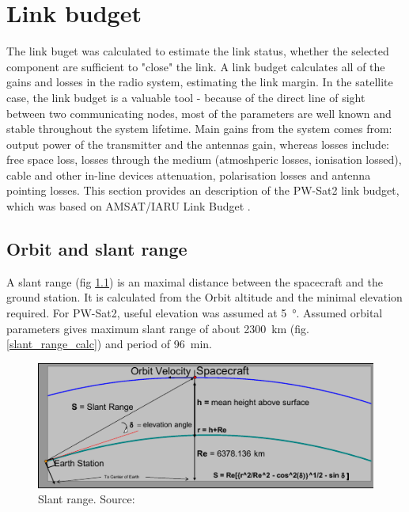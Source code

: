 \chapter{Link budget}
The link buget was calculated to estimate the link status, whether the selected component are sufficient to "close" the link. A link budget calculates all of the gains and losses in the radio system, estimating the link margin. In the satellite case, the link budget is a valuable tool - because of the direct line of sight between two communicating nodes, most of the parameters are well known and stable throughout the system lifetime. Main gains from the system comes from: output power of the transmitter and the antennas gain, whereas losses include: free space loss, losses through the medium (atmoshperic losses, ionisation lossed), cable and other in-line devices attenuation, polarisation losses and antenna pointing losses. This section provides an description of the PW-Sat2 link budget, which was based on AMSAT/IARU Link Budget \cite{amsat_link_budget}.

\section{Orbit and slant range}
A slant range (fig \ref{slant_range}) is an maximal distance between the spacecraft and the ground station. It is calculated from the Orbit altitude and the minimal elevation required. For PW-Sat2, useful elevation was assumed at \SI{5}{\degree}. Assumed orbital parameters gives maximum slant range of about \SI{2300}{\kilo\meter} (fig. \ref{slant_range_calc}) and period of \SI{96}{\minute}.

\begin{figure}
    \centering
    \includegraphics[width=0.8\paperwidth]{img/8/slant_range.pdf}
    \caption{Slant range. Source: \cite{amsat_link_budget}}
    \label{slant_range}
\end{figure}

